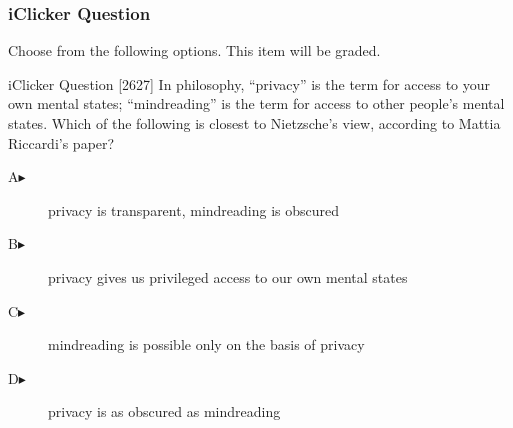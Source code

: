 \begin{frame}
  \frametitle{iClicker Question}
Choose from the following options. This item will be graded.
\begin{block}{iClicker Question}
[2627] In philosophy, ``privacy'' is the term for access to your own
mental states; ``mindreading'' is the term for access to other
people's mental states. Which of the following is closest to
Nietzsche's view, according to Mattia Riccardi's paper?
\end{block}
\begin{description}
\item[A\hspace{.2in}$\blacktriangleright$] privacy is transparent, mindreading is obscured
\item[B\hspace{.2in}$\blacktriangleright$] privacy gives us privileged access to our own mental states
\item[C\hspace{.2in}$\blacktriangleright$] mindreading is possible only on the basis of privacy
\item[D\hspace{.2in}$\blacktriangleright$] privacy is as obscured as mindreading
\end{description}
\end{frame}